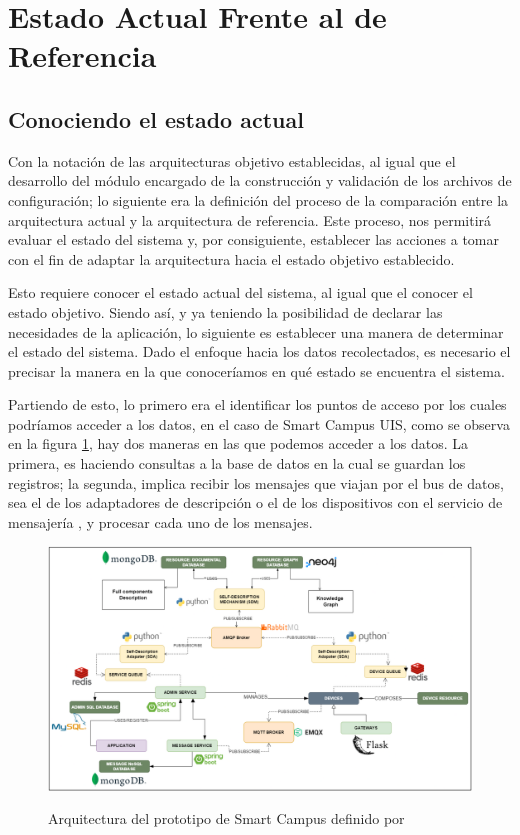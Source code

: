 \section{Estado Actual Frente al de Referencia}

\subsection{Conociendo el estado actual}

Con la notación de las arquitecturas objetivo establecidas, al igual que el desarrollo del módulo encargado de la construcción y validación de los archivos de configuración; lo siguiente era la definición del proceso de la comparación entre la arquitectura actual y la arquitectura de referencia. Este proceso, nos permitirá evaluar el estado del sistema y, por consiguiente, establecer las acciones a tomar con el fin de adaptar la arquitectura hacia el estado objetivo establecido.

Esto requiere conocer el estado actual del sistema, al igual que el conocer el estado objetivo. Siendo así, y ya teniendo la posibilidad de declarar las necesidades de la aplicación, lo siguiente es establecer una manera de determinar el estado del sistema. Dado el enfoque hacia los datos recolectados, es necesario el precisar la manera en la que conoceríamos en qué estado se encuentra el sistema.

Partiendo de esto, lo primero era el identificar los puntos de acceso por los cuales podríamos acceder a los datos, en el caso de Smart Campus UIS, como se observa en la figura \ref{fig:ArquitecturaSmartCampus}, hay dos maneras en las que podemos acceder a los datos. La primera, es haciendo consultas a la base de datos en la cual se guardan los registros; la segunda, implica recibir los mensajes que viajan por el bus de datos, sea el de los adaptadores de descripción o el de los dispositivos con el servicio de mensajería , y procesar cada uno de los mensajes.

\begin{figure}[ht]
    \centering
    \caption{Arquitectura del prototipo de Smart Campus definido por }
    \includegraphics[width=\linewidth]{images/ArquitecturaSmartCampus.png}
    \label{fig:ArquitecturaSmartCampus}
\end{figure}


